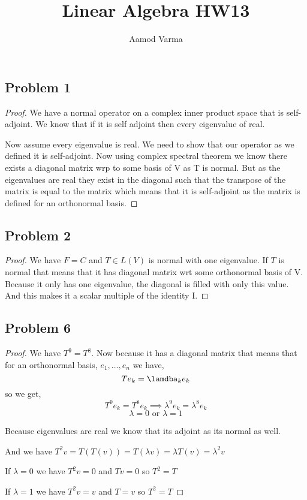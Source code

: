 \documentclass[a4paper]{report}
\title{Linear Algebra HW13}
\author{Aamod Varma}
\begin{document}
\maketitle
\date{}

\subsection*{Problem 1}
\begin{proof}
   We have a normal operator on a complex inner product space that is self-adjoint. We know that if it is self adjoint then every eigenvalue of real.

   Now assume every eigenvalue is real. We need to show that our operator as we defined it is self-adjoint. Now using complex spectral theorem we know there exists a diagonal matrix wrp to some basis of V as T is normal. But as the eigenvalues are real they exist in the diagonal such that the transpose of the matrix is equal to the matrix which means that it is self-adjoint as the matrix is defined for an orthonormal basis.

\end{proof}
\subsection*{Problem 2}
\begin{proof}
   We have $F = C$ and  $T \in L(V)$ is normal with one eigenvalue. If $T$ is normal that means that it has diagonal matrix wrt some orthonormal basis of V. Because it only has one  eigenvalue, the diagonal is filled with only this value. And this makes it a scalar multiple of the identity I.
\end{proof}

\subsection*{Problem 6}
\begin{proof}
   We have $T^{9} = T^{8}$. Now because it has a diagonal matrix that means that for an orthonormal basis, $e_1,\dots,e_n$  we have, 
   $$ Te_k =\lamdba_ke_k $$ 
   so we get, 
   $$ T^{9}e_k = T^{8}e_k \implies \lambda ^{9}e_k = \lambda ^{8}e_k $$ 
   $$ \lambda = 0 \text{ or } \lambda = 1 $$ 

   Because eigenvalues are real we know that its adjoint as its normal as well.

   And we have $T^2v = T(T(v)) = T(\lambda v) = \lambda T(v) = \lambda^2 v$

   If $\lambda = 0$ we have $T^2v = 0$ and $Tv = 0$ so  $T^2 = T$

   If $\lambda = 1$ we have $T^2v = v$ and $T = v$ so  $T^2 = T$
\end{proof}
\end{document}
